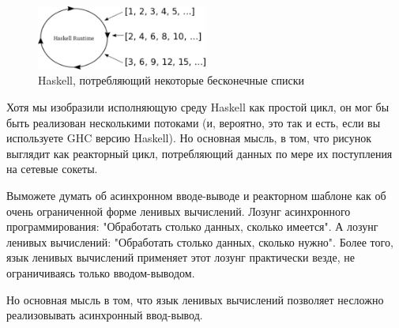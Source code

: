 \begin{figure}[h]
\begin{center}
    \includegraphics[width=0.5\textwidth]{images/haskell.pdf}
    \caption{Haskell, потребляющий некоторые бесконечные списки\label{fig:haskell}}
\end{center}
\end{figure}

Хотя мы изобразили исполняющую среду Haskell как простой цикл, 
он мог бы быть реализован несколькими потоками (и, вероятно, это 
так и есть, если вы используете GHC версию Haskell). Но основная 
мысль, в том, что рисунок выглядит как реакторный цикл, 
потребляющий данных по мере их поступления на сетевые сокеты.   


Выможете думать об асинхронном вводе-выводе и 
реакторном шаблоне как об очень ограниченной 
форме ленивых вычислений. Лозунг асинхронного программирования: 
"Обработать столько данных, сколько имеется". А лозунг 
ленивых вычислений: "Обработать столько данных, сколько нужно". 
Более того, язык ленивых вычислений применяет этот лозунг 
практически везде, не ограничиваясь только вводом-выводом.


Но основная мысль в том, что язык ленивых вычислений позволяет 
несложно реализовывать асинхронный ввод-вывод. 

